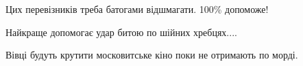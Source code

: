  
 
 
 
 

\begin{cmtfront}

Цих перевізників треба батогами відшмагати. 100\% допоможе!


Найкраще допомогає удар битою по шійних хребцях....


Вівці будуть крутити московитське кіно поки не отримають по морді.
	
\end{cmtfront}
